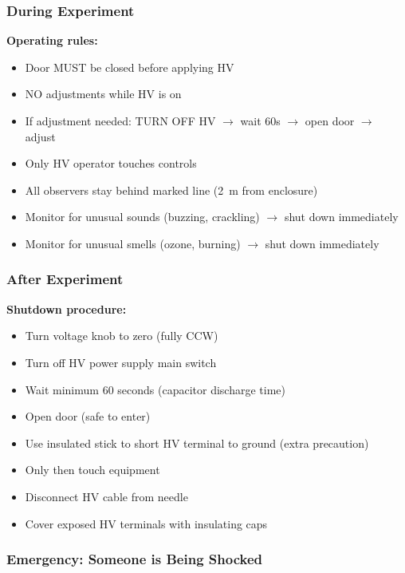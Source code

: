 \documentclass[11pt]{article}
\begin{document}
\subsubsection{During Experiment}

\textbf{Operating rules:}

\begin{itemize}
\item Door MUST be closed before applying HV
\item NO adjustments while HV is on
\item If adjustment needed: TURN OFF HV $\rightarrow$ wait 60s $\rightarrow$ open door $\rightarrow$ adjust
\item Only HV operator touches controls
\item All observers stay behind marked line (2~m from enclosure)
\item Monitor for unusual sounds (buzzing, crackling) $\rightarrow$ shut down immediately
\item Monitor for unusual smells (ozone, burning) $\rightarrow$ shut down immediately
\end{itemize}

\subsubsection{After Experiment}

\textbf{Shutdown procedure:}

\begin{itemize}
\item Turn voltage knob to zero (fully CCW)
\item Turn off HV power supply main switch
\item Wait minimum 60 seconds (capacitor discharge time)
\item Open door (safe to enter)
\item Use insulated stick to short HV terminal to ground (extra precaution)
\item Only then touch equipment
\item Disconnect HV cable from needle
\item Cover exposed HV terminals with insulating caps
\end{itemize}

\subsubsection{Emergency: Someone is Being Shocked}
\end{document}
